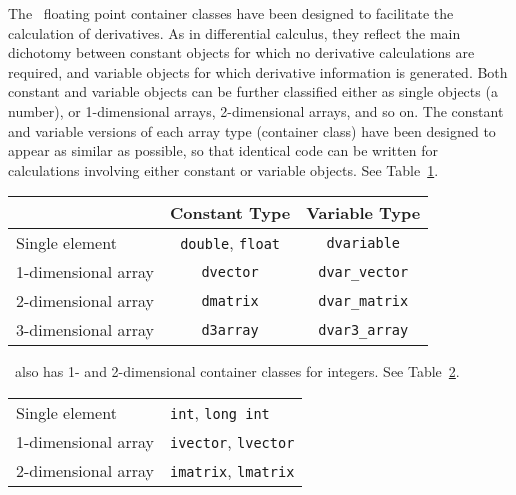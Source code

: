 \documentclass{admbmanual}
\begin{document}
The \scAD\ floating point container classes have been designed to
facilitate the calculation of derivatives. As in differential calculus,
they reflect
the main dichotomy between constant objects for which no derivative
calculations are required, and variable objects for which derivative
information is generated.  
Both constant and variable objects can be
further classified either as single objects (a number), or 1-dimensional arrays,
2-dimensional arrays, and so on. The constant
and variable versions of each array type (container class) have
been designed to appear as similar as possible, so that identical
code can be written for calculations involving either constant or
variable objects.  See Table~\ref{tab:types}.
\begin{table}[!h]
\begin{center}
\begin{tabular}{@{\vrule height 12pt depth7pt width0pt} l  |  c  |  c }
 \hline
 & \bf Constant Type & \bf Variable Type \\
 \hline
Single element&\texttt{double}, \texttt{float}&\texttt{dvariable} \\
1-dimensional array&\texttt{dvector}&\texttt{dvar\_vector} \\
2-dimensional array&\texttt{dmatrix}&\texttt{dvar\_matrix} \\
3-dimensional array&\texttt{d3array}&\texttt{dvar3\_array} \\[3pt]
\hline
\end{tabular}
\end{center}
\emptycaption
\label{tab:types}
\end{table}

\scAD\ also has 1- and 2-dimensional container classes for integers.  See Table~\ref{tab:integer-container-classes}.
\begin{table}[!h]
\begin{center}
\begin{tabular}{@{\vrule height 12pt depth7pt width0pt}  l  |  l }
\hline
Single element&\texttt{int}, \texttt{long int} \\
1-dimensional array&\texttt{ivector}, \texttt{lvector} \\
2-dimensional array&\texttt{imatrix}, \texttt{lmatrix} \\
\hline
\end{tabular}
\end{center}
\emptycaption
\label{tab:integer-container-classes}
\end{table}
\end{document}
